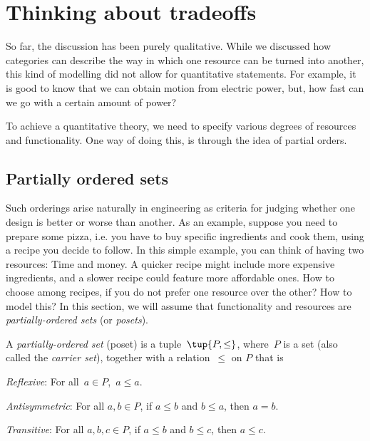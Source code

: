 \section{Thinking about tradeoffs}
So far, the discussion has been purely qualitative. While we discussed how
categories can describe the way in which one resource can be turned into another,
this kind of modelling did not allow for quantitative statements. For example, it
is good to know that we can obtain motion from electric power, but, how fast can
we go with a certain amount of power?

To achieve a quantitative theory, we need to specify various degrees of resources and functionality.
One way of doing this, is through the idea of partial orders.

\subsection{Partially ordered sets}

Such orderings arise naturally in engineering as criteria for judging whether one design is better or worse than another. As an example, suppose you need to prepare some pizza, i.e. you have to buy specific ingredients and cook them, using a recipe you decide to follow. In this simple example, you can think of having two resources: Time and money. A quicker recipe might include more expensive ingredients, and a slower recipe could feature more affordable ones. How to choose among recipes, if you do not prefer one resource over the other? How to model this? In this section, we will assume that functionality and resources
are \emph{partially-ordered sets} (or \emph{posets}).

\begin{definition}
\label{def:poset}
A \emph{partially-ordered set} (poset) is a tuple~$\tup{P, \leq}$,
where~$P$ is a set (also called the \emph{carrier set}), together with a
relation~$\leq$ on $P$ that is
\begin{compactenum}
    \item \emph{Reflexive}: For all~$a\in P$,~$a\leq a$.
    \item \emph{Antisymmetric}: For all $a,b\in P$, if $a\leq b$ and $b\leq a$, then $a=b$.
    \item \emph{Transitive}: For all $a,b,c\in P$, if $a\leq b$ and $b\leq c$, then $a\leq c$.
\end{compactenum}
\end{definition}

